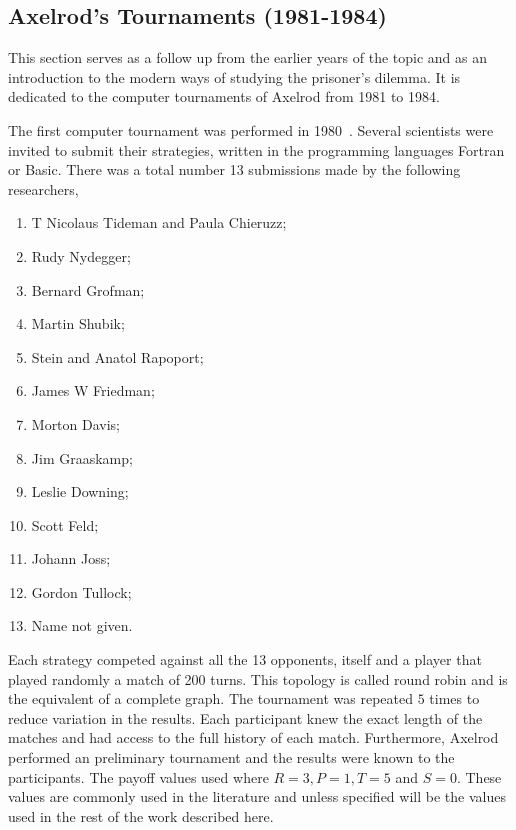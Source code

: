 \documentclass{article}
\begin{document}
\subsection{Axelrod's Tournaments (1981-1984)}\label{subsection:axelrods_tournament}

This section serves as a follow up from the earlier years of the topic and as an
introduction to the modern ways of studying the prisoner's dilemma. It is 
dedicated to the computer tournaments of Axelrod from 1981 to 1984. 

The first computer tournament was performed in 1980~\cite{Axelrod1980a}.
Several scientists were invited to submit their strategies, written in the
programming languages Fortran or Basic. There was a total number 13 submissions
made by the following researchers,

\begin{multicols}{2}
    \begin{enumerate}
        \item T Nicolaus Tideman and Paula Chieruzz;
        \item Rudy Nydegger;
        \item Bernard Grofman;
        \item Martin Shubik;
        \item Stein and Anatol Rapoport;
        \item James W Friedman;
        \item Morton Davis;
        \item Jim Graaskamp;
        \item Leslie Downing;
        \item Scott Feld;
        \item Johann Joss;
        \item Gordon Tullock;
        \item Name not given.
    \end{enumerate}
\end{multicols}

Each strategy competed against all the 13 opponents, itself and a player that played
randomly a match of 200 turns. This topology is called round robin and is the 
equivalent of a complete graph. The tournament was repeated \(5\) times to
reduce variation in the results. Each participant knew the exact length of the
matches and had access to the full history of each match. Furthermore, Axelrod
performed an preliminary tournament and the results were known to the participants.
The payoff values used where \(R=3, P=1, T=5\) and \(S=0\). These values are
commonly used in the literature and unless specified will be the values used in
the rest of the work described here. 
\end{document}
